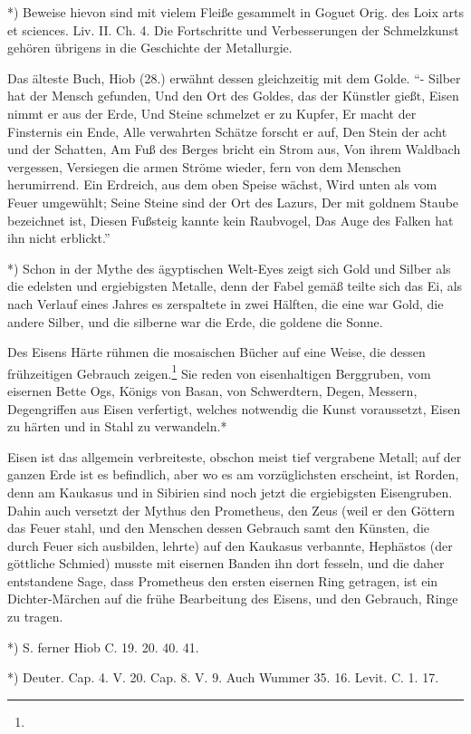 \documentclass[a4paper, 11pt, oneside, polutonikogreek, german]{article}
\begin{document}
*) Beweise hievon sind mit vielem Fleiße gesammelt in Goguet Orig. des Loix arts et sciences. Liv. II. Ch. 4. Die Fortschritte und Verbesserungen der Schmelzkunst gehören übrigens in die Geschichte der Metallurgie.

Das älteste Buch, Hiob (28.) erwähnt dessen gleichzeitig mit dem Golde. "`- Silber hat der Mensch gefunden, Und den Ort des Goldes, das der Künstler gießt, Eisen nimmt er aus der Erde, Und Steine schmelzet er zu Kupfer, Er macht der Finsternis ein Ende, Alle verwahrten Schätze forscht er auf, Den Stein der acht und der Schatten, Am Fuß des Berges bricht ein Strom aus, Von ihrem Waldbach vergessen, Versiegen die armen Ströme wieder, fern von dem Menschen herumirrend. Ein Erdreich, aus dem oben Speise wächst, Wird unten als vom Feuer umgewühlt; Seine Steine sind der Ort des Lazurs, Der mit goldnem Staube bezeichnet ist, Diesen Fußsteig kannte kein Raubvogel, Das Auge des Falken hat ihn nicht erblickt."'

*) Schon in der Mythe des ägyptischen Welt-Eyes zeigt sich Gold und Silber als die edelsten und ergiebigsten Metalle, denn der Fabel gemäß teilte sich das Ei, als nach Verlauf eines Jahres es zerspaltete in zwei Hälften, die eine war Gold, die andere Silber, und die silberne war die Erde, die goldene die Sonne.

Des Eisens Härte rühmen die mosaischen Bücher auf eine Weise, die dessen frühzeitigen Gebrauch zeigen.\footnote{} Sie reden von eisenhaltigen Berggruben, vom eisernen Bette Ogs, Königs von Basan, von Schwerdtern, Degen, Messern, Degengriffen aus Eisen verfertigt, welches notwendig die Kunst voraussetzt, Eisen zu härten und in Stahl zu verwandeln.*

Eisen ist das allgemein verbreiteste, obschon meist tief vergrabene Metall; auf der ganzen Erde ist es befindlich, aber wo es am vorzüglichsten erscheint, ist Rorden, denn am Kaukasus und in Sibirien sind noch jetzt die ergiebigsten Eisengruben. Dahin auch versetzt der Mythus den Prometheus, den Zeus (weil er den Göttern das Feuer stahl, und den Menschen dessen Gebrauch samt den Künsten, die durch Feuer sich ausbilden, lehrte) auf den Kaukasus verbannte, Hephästos (der göttliche Schmied) musste mit eisernen Banden ihn dort fesseln, und die daher entstandene Sage, dass Prometheus den ersten eisernen Ring getragen, ist ein Dichter-Märchen auf die frühe Bearbeitung des Eisens, und den Gebrauch, Ringe zu tragen.

*) S. ferner Hiob C. 19. 20. 40. 41.

*) Deuter. Cap. 4. V. 20. Cap. 8. V. 9. Auch Wummer 35. 16. Levit. C. 1. 17.
\end{document}
